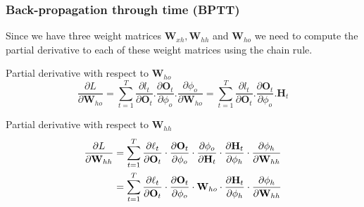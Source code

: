 \documentclass[
	11pt,
]{beamer}
\begin{document}

\begin{frame}
	\frametitle{Back-propagation through time (BPTT)}

		Since we have three weight matrices $\mathbf{W}_{xh}, \mathbf{W}_{hh}$ and $\mathbf{W}_{ho}$ we need to
compute the partial derivative to each of these weight matrices using the
chain rule.
		\smallskip
        \begin{block}{Partial derivative with respect to $\mathbf{W}_{ho}$}
        \begin{equation*}
            \frac{\partial L}{\partial \mathbf{W}_{ho}} = \sum_{t=1}^{T}\frac{\partial l_t}{\partial \mathbf{O}_t}.\frac{\partial \mathbf{O}_t}{\partial \phi_o}.\frac{\partial \phi_o}{\partial \mathbf{W}_{ho}} = \sum_{t=1}^{T}\frac{\partial l_t}{\partial \mathbf{O}_t}.\frac{\partial \mathbf{O}_t}{\partial \phi_o}.\mathbf{H}_t
        \end{equation*}
		\end{block}
	\begin{block}{Partial derivative with respect to $\mathbf{W}_{hh}$}
        \begin{equation*}
			\begin{split}
            \pdv{L}{\mathbf{W}_{hh}} &= \sum_{t=1}^T \pdv{\ell_t}{\mathbf{O}_t} \cdot \pdv{\mathbf{O}_t}{\phi_o} \cdot \pdv{\phi_o}{\mathbf{H}_t} \cdot \pdv{\mathbf{H}_t}{\phi_h} \cdot \pdv{\phi_h}{\mathbf{W}_{hh}} \\
									 &= \sum_{t=1}^T \pdv{\ell_t}{\mathbf{O}_t} \cdot \pdv{\mathbf{O}_t}{\phi_o} \cdot \mathbf{W}_{ho} \cdot \pdv{\mathbf{H}_t}{\phi_h} \cdot \pdv{\phi_h}{\mathbf{W}_{hh}} 
			\end{split}
        \end{equation*}
	\end{block}

\end{frame}
\end{document}
